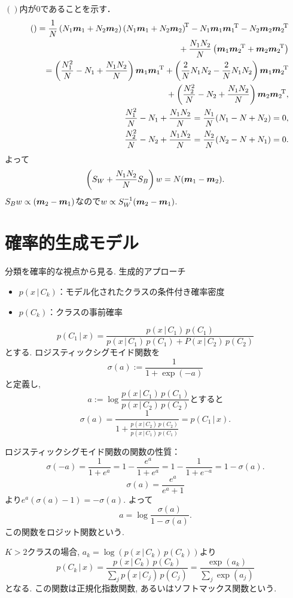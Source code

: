 $()$内が$0$であることを示す．
\begin{eqnarray*}&&
()
 = \frac{1}{N}\outp{\left(N_1 \bmm_1+N_2 \bmm_2\right)}-N_1 \outp{\bmm_1}-N_2 \outp{\bmm_2}
\\&&\phantom{()={}}
   + \frac{N_1 N_2}{N}\left(\bmm_1 \trans{\bmm_2}+\bmm_2 \trans{\bmm_2}\right)
\\&&\phantom{()}
 = \left(\frac{N_1^2}{N}-N_1+\frac{N_1 N_2}{N}\right)\outp{\bmm_1}+\left(\frac{2}{N} N_1 N_2 - \frac{2}{N}N_1 N_2\right)\bmm_1\trans{\bmm_2}
\\&&\phantom{()={}}
   + \left(\frac{N_2^2}{N}-N_2+\frac{N_1 N_2}{N}\right)\outp{\bmm_2},
\\&&
\frac{N_1^2}{N}-N_1+\frac{N_1 N_2}{N}=\frac{N_1}{N}(N_1-N+N_2)=0,
\\&&
\frac{N_2^2}{N}-N_2+\frac{N_1 N_2}{N}=\frac{N_2}{N}(N_2-N+N_1)=0.
\end{eqnarray*}
よって
$$
\left(S_W+\frac{N_1 N_2}{N}S_B\right)w=N(\bm {m}_1-\bm {m}_2).
$$
$S_Bw\propto(\bm {m}_2 -\bm {m}_1)$なので$w \propto S_W^{-1}(\bm {m}_2 - \bm {m}_1)$.

\section{確率的生成モデル}
分類を確率的な視点から見る.
生成的アプローチ
\begin{itemize}
\item $p(x\,|\,C_k)$：モデル化されたクラスの条件付き確率密度
\item $p(C_k)$：クラスの事前確率
\end{itemize}
$$
p(C_1\,|\,x)=\frac{p(x\,|\,C_1)\,p(C_1)}{p(x\,|\,C_1)\,p(C_1)+P(x\,|\,C_2)\,p(C_2)}
$$
とする. ロジスティックシグモイド関数を
$$
\sigma(a):=\frac{1}{1+\exp(-a)}
$$
と定義し,
$$
a:=\log \frac{p(x\,|\,C_1)\,p(C_1)}{p(x\,|\,C_2)\,p(C_2)}とすると
$$
$$
\sigma(a)=\frac{1}{1+\frac{p(x\,|\,C_2)\,p(C_2)}{p(x\,|\,C_1)\,p(C_1)}}=p(C_1\,|\,x).
$$

ロジスティックシグモイド関数の関数の性質：
$$
\sigma(-a)=\frac{1}{1+e^a}=1-\frac{e^a}{1+e^a}=1-\frac{1}{1+e^{-a}}=1-\sigma(a).
$$
$$
\sigma(a)=\frac{e^a}{e^a+1}
$$
より$e^a(\sigma(a)-1)=-\sigma(a)$. よって
$$
a=\log \frac{\sigma(a)}{1-\sigma(a)}.
$$
この関数をロジット関数という.

$K>2$クラスの場合, $a_k=\log(p(x\,|\,C_k)\,p(C_k))$より
$$
p(C_k\,|\,x)=\frac{p(x\,|\,C_k)\,p(C_k)}{\sum_j p(x\,|\,C_j)\,p(C_j)}=\frac{\exp(a_k)}{\sum_j \exp(a_j)}
$$
となる. この関数は正規化指数関数, あるいはソフトマックス関数という.

